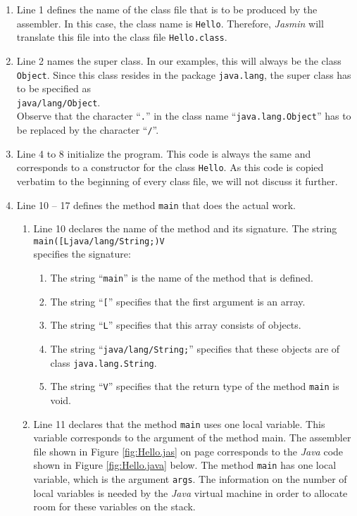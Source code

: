 \begin{enumerate}
\item Line 1 defines the name of the class file that is to be produced by the assembler.
      In this case, the class name is \texttt{Hello}.  Therefore, \textsl{Jasmin} will translate
      this file into the class file \texttt{Hello.class}.
\item Line 2 names the super class.  In our examples, this will always be the class
      \texttt{Object}.  Since this class resides in the package \texttt{java.lang}, the super class
      has to be specified as
      \\[0.2cm]
      \hspace*{1.3cm}
      \texttt{java/lang/Object}.
      \\[0.2cm]
      Observe that the character ``\texttt{.}'' in the class name ``\texttt{java.lang.Object}''
      has to be replaced by the character ``\texttt{/}''.
\item Line 4 to 8 initialize the program.  This code is always the same and corresponds to a
      constructor for the class \texttt{Hello}.  As this code is copied verbatim to the beginning 
      of every class file, we will not discuss it further. 
\item Line 10 -- 17 defines the method \texttt{main} that does the actual work.
  \begin{enumerate}
  \item Line 10 declares the name of the method and its signature.  The string
        \\[0.2cm]
        \hspace*{1.3cm}
        \texttt{main([Ljava/lang/String;)V}
        \\[0.2cm]
        specifies the signature:
        \begin{enumerate}
        \item The string ``\texttt{main}''  is the name of the method that is defined.
        \item The string ``\texttt{[}'' specifies that the first argument is an array.
        \item The string ``\texttt{L}'' specifies that this array consists of objects.
        \item The string ``\texttt{java/lang/String;}'' specifies that these objects are of class
              \texttt{java.lang.String}.
        \item The string ``\texttt{V}'' specifies that the return type of the method \texttt{main}
              is void.
       \end{enumerate}
  \item Line 11 declares that the method \texttt{main} uses one local variable.  This variable
        corresponds to the argument of the method main.  The assembler file shown in Figure
        \ref{fig:Hello.jas} on page \pageref{fig:Hello.jas} corresponds to the \textsl{Java} code
        shown in Figure \ref{fig:Hello.java} below.  The method \texttt{main} has one local
        variable, which is the argument \texttt{args}.
        The information on the number of local variables is needed by the \textsl{Java} virtual
        machine in order to allocate room for these variables on the stack.


\end{enumerate}
\end{enumerate}
